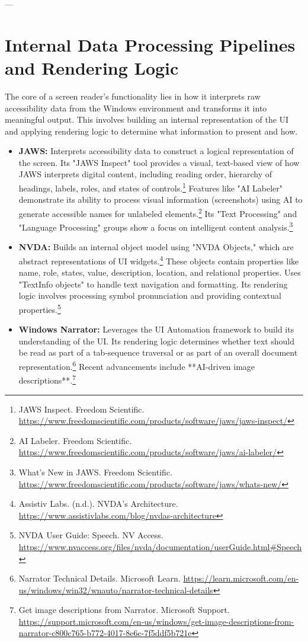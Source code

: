 ---

\section{Internal Data Processing Pipelines and Rendering Logic}

The core of a screen reader's functionality lies in how it interprets raw accessibility data from the Windows environment and transforms it into meaningful output. This involves building an internal representation of the UI and applying rendering logic to determine what information to present and how.

\begin{itemize}[leftmargin=*,noitemsep,topsep=0pt]
    \item \textbf{JAWS:} Interprets accessibility data to construct a logical representation of the screen. Its "JAWS Inspect" tool provides a visual, text-based view of how JAWS interprets digital content, including reading order, hierarchy of headings, labels, roles, and states of controls.\footnote{JAWS Inspect. Freedom Scientific. \url{https://www.freedomscientific.com/products/software/jaws/jaws-inspect/}} Features like "AI Labeler" demonstrate its ability to process visual information (screenshots) using AI to generate accessible names for unlabeled elements.\footnote{AI Labeler. Freedom Scientific. \url{https://www.freedomscientific.com/products/software/jaws/ai-labeler/}} Its "Text Processing" and "Language Processing" groups show a focus on intelligent content analysis.\footnote{What's New in JAWS. Freedom Scientific. \url{https://www.freedomscientific.com/products/software/jaws/whats-new/}}
    \item \textbf{NVDA:} Builds an internal object model using "NVDA Objects," which are abstract representations of UI widgets.\footnote{Assistiv Labs. (n.d.). NVDA's Architecture. \url{https://www.assistivlabs.com/blog/nvdas-architecture}} These objects contain properties like name, role, states, value, description, location, and relational properties. Uses "TextInfo objects" to handle text navigation and formatting. Its rendering logic involves processing symbol pronunciation and providing contextual properties.\footnote{NVDA User Guide: Speech. NV Access. \url{https://www.nvaccess.org/files/nvda/documentation/userGuide.html#Speech}}
    \item \textbf{Windows Narrator:} Leverages the UI Automation framework to build its understanding of the UI. Its rendering logic determines whether text should be read as part of a tab-sequence traversal or as part of an overall document representation.\footnote{Narrator Technical Details. Microsoft Learn. \url{https://learn.microsoft.com/en-us/windows/win32/wnauto/narrator-technical-details}} Recent advancements include **AI-driven image descriptions**.\footnote{Get image descriptions from Narrator. Microsoft Support. \url{https://support.microsoft.com/en-us/windows/get-image-descriptions-from-narrator-c800c765-b772-4017-8e6c-7f5ddf5b721e}}

\end{itemize}

